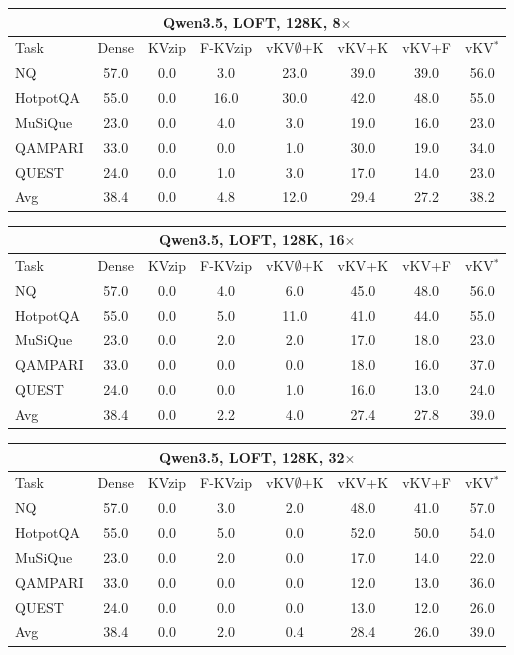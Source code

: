 \begin{tabular}{lccccccc}
\toprule
\multicolumn{8}{c}{Qwen3.5, LOFT, 128K, 8$\times$} \\
\midrule
Task & Dense & KVzip & F-KVzip & vKV$\emptyset$+K & vKV+K & vKV+F & vKV$^\ast$ \\
\midrule
NQ & 57.0 & 0.0 & 3.0 & 23.0 & 39.0 & 39.0 & 56.0 \\
HotpotQA & 55.0 & 0.0 & 16.0 & 30.0 & 42.0 & 48.0 & 55.0 \\
MuSiQue & 23.0 & 0.0 & 4.0 & 3.0 & 19.0 & 16.0 & 23.0 \\
QAMPARI & 33.0 & 0.0 & 0.0 & 1.0 & 30.0 & 19.0 & 34.0 \\
QUEST & 24.0 & 0.0 & 1.0 & 3.0 & 17.0 & 14.0 & 23.0 \\
\midrule
Avg & 38.4 & 0.0 & 4.8 & 12.0 & 29.4 & 27.2 & 38.2 \\
\bottomrule
\end{tabular}
\vspace{0.8em}

\begin{tabular}{lccccccc}
\toprule
\multicolumn{8}{c}{Qwen3.5, LOFT, 128K, 16$\times$} \\
\midrule
Task & Dense & KVzip & F-KVzip & vKV$\emptyset$+K & vKV+K & vKV+F & vKV$^\ast$ \\
\midrule
NQ & 57.0 & 0.0 & 4.0 & 6.0 & 45.0 & 48.0 & 56.0 \\
HotpotQA & 55.0 & 0.0 & 5.0 & 11.0 & 41.0 & 44.0 & 55.0 \\
MuSiQue & 23.0 & 0.0 & 2.0 & 2.0 & 17.0 & 18.0 & 23.0 \\
QAMPARI & 33.0 & 0.0 & 0.0 & 0.0 & 18.0 & 16.0 & 37.0 \\
QUEST & 24.0 & 0.0 & 0.0 & 1.0 & 16.0 & 13.0 & 24.0 \\
\midrule
Avg & 38.4 & 0.0 & 2.2 & 4.0 & 27.4 & 27.8 & 39.0 \\
\bottomrule
\end{tabular}
\vspace{0.8em}

\begin{tabular}{lccccccc}
\toprule
\multicolumn{8}{c}{Qwen3.5, LOFT, 128K, 32$\times$} \\
\midrule
Task & Dense & KVzip & F-KVzip & vKV$\emptyset$+K & vKV+K & vKV+F & vKV$^\ast$ \\
\midrule
NQ & 57.0 & 0.0 & 3.0 & 2.0 & 48.0 & 41.0 & 57.0 \\
HotpotQA & 55.0 & 0.0 & 5.0 & 0.0 & 52.0 & 50.0 & 54.0 \\
MuSiQue & 23.0 & 0.0 & 2.0 & 0.0 & 17.0 & 14.0 & 22.0 \\
QAMPARI & 33.0 & 0.0 & 0.0 & 0.0 & 12.0 & 13.0 & 36.0 \\
QUEST & 24.0 & 0.0 & 0.0 & 0.0 & 13.0 & 12.0 & 26.0 \\
\midrule
Avg & 38.4 & 0.0 & 2.0 & 0.4 & 28.4 & 26.0 & 39.0 \\
\bottomrule
\end{tabular}
\vspace{0.8em}

